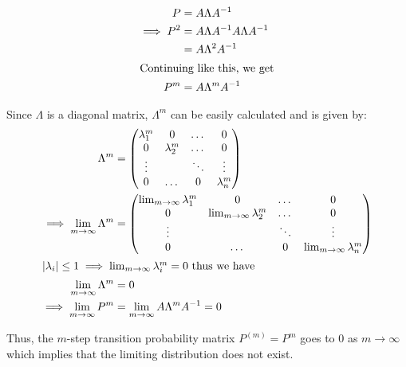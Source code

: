 \documentclass[12pt, oneside]{article}
\begin{document}
\begin{enumerate}
{\begin{enumerate}
{            \begin{align*}
                P &= A \Lambda A^{-1} \\
                \implies P^2 &= A \Lambda A^{-1} A \Lambda A^{-1} \\
                             &= A \Lambda ^ 2 A^{-1} \\
                \intertext{Continuing like this, we get}
                P^m &= A \Lambda ^ m A^{-1} \\
            \end{align*}

            Since \(\Lambda\) is a diagonal matrix, \(\Lambda^m\) can be easily calculated and is given
            by:
            \begin{align*}
                \Lambda^m &= \begin{pmatrix}
                    \lambda_1^m & 0         & \dots  & 0 \\
                    0         & \lambda_2^m & \dots  & 0 \\
                    \vdots    &           & \ddots & \vdots\\
                    0         & \dots     & 0      & \lambda_n^m
                \end{pmatrix} \\
                \implies \lim_{m \to \infty} \Lambda^m &= \begin{pmatrix}
                    \lim_{m \to \infty}\lambda_1^m & 0         & \dots  & 0 \\
                    0         & \lim_{m \to \infty} \lambda_2^m & \dots  & 0 \\
                    \vdots    &           & \ddots & \vdots\\
                    0         & \dots     & 0      & \lim_{m \to \infty} \lambda_n^m
                \end{pmatrix} \\
                \intertext{\(|\lambda_i| \leq 1 \implies \lim_{m \to \infty}\lambda_i^m = 0\) thus we have}
                \lim_{m \to \infty} \Lambda^m &= 0 \\
                \implies \lim_{m \to \infty} P^m &= \lim_{m \to \infty} A \Lambda^m A^{-1} = 0
            \end{align*}

            Thus, the \(m\)-step transition probability matrix \(P^{(m)} = P^m\) goes to
            0 as \(m \to \infty\) which implies that the limiting distribution does not
            exist.

}
\end{enumerate}}
\end{enumerate}
\end{document}
